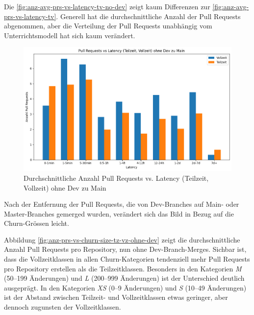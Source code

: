 Die \autoref{fig:anz-avg-prs-vs-latency-tv-no-dev} zeigt kaum Differenzen zur \autoref{fig:anz-avg-prs-vs-latency-tv}. Generell hat die durchschnittliche Anzahl der Pull Requests abgenommen, aber die Verteilung der Pull Requests unabhängig vom Unterrichtsmodell hat sich kaum verändert. 

\begin{figure}[htbp]
    \includegraphics[width=\textwidth]{Figures/anz-avg-prs-vs-latency-tv-no-dev.png}
    \caption{Durchschnittliche Anzahl Pull Requests vs. Latency (Teilzeit, Vollzeit) ohne Dev zu Main}
    \label{fig:anz-avg-prs-vs-latency-tv-no-dev}
\end{figure}
\newpage

Nach der Entfernung der Pull Requests, die von Dev-Branches auf Main- oder Master-Branches gemerged wurden, verändert sich das Bild in Bezug auf die Churn-Grössen leicht.

Abbildung \autoref{fig:anz-prs-vs-churn-size-tz-vz-ohne-dev} zeigt die durchschnittliche Anzahl Pull Requests pro Repository, nun ohne Dev-Branch-Merges. Sichbar ist, dass die Vollzeitklassen in allen Churn-Kategorien tendenziell mehr Pull Requests pro Repository erstellen als die Teilzeitklassen. Besonders in den Kategorien \textit{M} (50–199 Änderungen) und \textit{L} (200–999 Änderungen) ist der Unterschied deutlich ausgeprägt. In den Kategorien \textit{XS} (0–9 Änderungen) und \textit{S} (10–49 Änderungen) ist der Abstand zwischen Teilzeit- und Vollzeitklassen etwas geringer, aber dennoch zugunsten der Vollzeitklassen.

